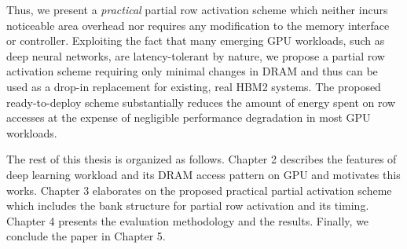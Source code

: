 Thus, we present a \emph{practical} partial row activation scheme which neither incurs noticeable area overhead nor requires any modification to the memory interface or controller. Exploiting the fact that many emerging GPU workloads, such as deep neural networks, are latency-tolerant by nature, we propose a partial row activation scheme requiring only minimal changes in DRAM and thus can be used as a drop-in replacement for existing, real HBM2 systems. The proposed ready-to-deploy scheme substantially reduces the amount of energy spent on row accesses at the expense of negligible performance degradation in most GPU workloads.

The rest of this thesis is organized as follows. Chapter 2 describes the features of deep learning workload and its DRAM access pattern on GPU and motivates this works. Chapter 3 elaborates on the proposed practical partial activation scheme which includes the bank structure for partial row activation and its timing. Chapter 4 presents the evaluation methodology and the results. Finally, we conclude the paper in Chapter 5.
